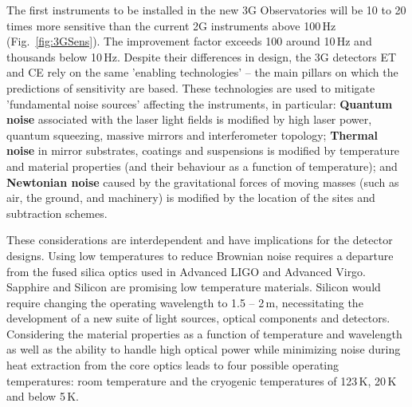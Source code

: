 The first instruments to be installed in the new \ac{3G} Observatories will be 10 to 20 times more sensitive than the current 
\ac{2G} instruments above 100\,Hz (Fig.~\ref{fig:3GSens}).  The improvement factor exceeds 100 around 10\,Hz and thousands below 10\,Hz. Despite their differences in design, the \ac{3G} detectors \ac{ET} and \ac{CE} rely on the same 'enabling technologies' -- the main pillars on which the predictions of sensitivity are based. These technologies are used to mitigate 'fundamental noise sources' affecting the instruments, in particular: \textbf{Quantum noise} associated with the laser light fields is modified by high laser power, quantum squeezing, massive mirrors and interferometer topology; \textbf{Thermal noise} in mirror substrates, coatings and suspensions is modified by temperature and material properties (and their behaviour as a function of temperature); and \textbf{Newtonian noise} caused by the gravitational forces of moving masses (such as air, the ground, and machinery) is modified by the location of the sites and subtraction schemes. 

These considerations are interdependent and have implications for the detector designs. Using low temperatures to reduce Brownian noise requires a departure from the fused silica optics used in Advanced LIGO and Advanced Virgo. Sapphire and Silicon are promising low temperature materials. Silicon would require changing the operating wavelength to 1.5 -- 2\,\micro m, necessitating the development of a new suite of light sources, optical components and detectors. Considering the material properties as a function of temperature and wavelength as well as the ability to handle high optical power while minimizing noise during heat extraction from the core optics leads to four possible operating temperatures:
room temperature and the cryogenic temperatures of 123\,K, 20\,K and below 5\,K.



